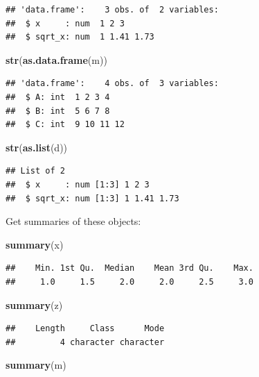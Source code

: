 \documentclass[12pt,]{book}
\newenvironment{Shaded}{\begin{snugshade}}{\end{snugshade}}
\newcommand{\KeywordTok}[1]{\textcolor[rgb]{0.13,0.29,0.53}{\textbf{#1}}}
\newcommand{\NormalTok}[1]{#1}
\begin{document}
\begin{verbatim}
## 'data.frame':    3 obs. of  2 variables:
##  $ x     : num  1 2 3
##  $ sqrt_x: num  1 1.41 1.73
\end{verbatim}

\begin{Shaded}
\begin{Highlighting}[]
\KeywordTok{str}\NormalTok{(}\KeywordTok{as.data.frame}\NormalTok{(m))}
\end{Highlighting}
\end{Shaded}

\begin{verbatim}
## 'data.frame':    4 obs. of  3 variables:
##  $ A: int  1 2 3 4
##  $ B: int  5 6 7 8
##  $ C: int  9 10 11 12
\end{verbatim}

\begin{Shaded}
\begin{Highlighting}[]
\KeywordTok{str}\NormalTok{(}\KeywordTok{as.list}\NormalTok{(d))}
\end{Highlighting}
\end{Shaded}

\begin{verbatim}
## List of 2
##  $ x     : num [1:3] 1 2 3
##  $ sqrt_x: num [1:3] 1 1.41 1.73
\end{verbatim}

Get summaries of these objects:

\begin{Shaded}
\begin{Highlighting}[]
\KeywordTok{summary}\NormalTok{(x)}
\end{Highlighting}
\end{Shaded}

\begin{verbatim}
##    Min. 1st Qu.  Median    Mean 3rd Qu.    Max. 
##     1.0     1.5     2.0     2.0     2.5     3.0
\end{verbatim}

\begin{Shaded}
\begin{Highlighting}[]
\KeywordTok{summary}\NormalTok{(z)}
\end{Highlighting}
\end{Shaded}

\begin{verbatim}
##    Length     Class      Mode 
##         4 character character
\end{verbatim}

\begin{Shaded}
\begin{Highlighting}[]
\KeywordTok{summary}\NormalTok{(m)}
\end{Highlighting}
\end{Shaded}
\end{document}

